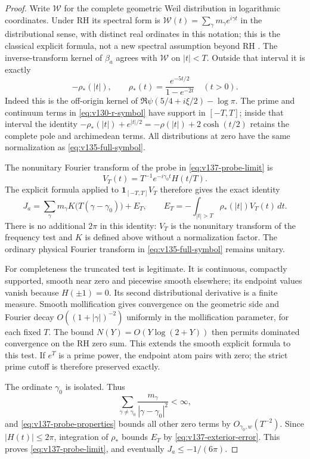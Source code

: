 \begin{proof}
Write $\mathcal W$ for the complete geometric Weil distribution in
logarithmic coordinates. Under RH its spectral form is
$\mathcal W(t)=\sum_\gamma m_\gamma e^{i\gamma t}$ in the distributional
sense, with distinct real ordinates in this notation; this is the
classical explicit formula, not a new spectral assumption beyond RH
\cite[Theorem 2.1]{BurnolExplicit2000}.
The inverse-transform kernel of $\beta_a$ agrees with $\mathcal W$
on $|t|<T$. Outside that interval it is exactly
\[
 -\rho_*(|t|),\qquad
 \rho_*(t)=\frac{e^{-5t/2}}{1-e^{-2t}}\quad(t>0).
\]
Indeed this is the off-origin kernel of
$\Re\psi(5/4+i\xi/2)-\log\pi$. The prime and continuum terms in
\eqref{eq:v130-r-symbol} have support in $[-T,T]$; inside that interval
the identity
$-\rho_*(|t|)+e^{|t|/2}=-\rho(|t|)+2\cosh(t/2)$
retains the complete pole and archimedean terms. All distributions at
zero have the same normalization as \eqref{eq:v135-full-symbol}.

The nonunitary Fourier transform of the probe in \eqref{eq:v137-probe-limit}
is
\[
 V_T(t)=T^{-1}e^{-i\gamma_0t}H(t/T).
\]
The explicit formula applied to $\mathbf1_{[-T,T]}V_T$ therefore gives
the exact identity
\begin{equation}\label{eq:v137-zero-sum}
 J_a=\sum_\gamma m_\gamma K\bigl(T(\gamma-\gamma_0)\bigr)+E_T,
 \qquad
 E_T=-\int_{|t|>T}\rho_*(|t|)V_T(t)\,dt.
\end{equation}
There is no additional $2\pi$ in this identity: $V_T$ is the
nonunitary transform of the frequency test and $K$ is defined above
without a normalization factor. The ordinary physical Fourier transform
in \eqref{eq:v135-full-symbol} remains unitary.

For completeness the truncated test is legitimate. It is continuous,
compactly supported, smooth near zero and piecewise smooth elsewhere;
its endpoint values vanish because $H(\pm1)=0$. Its second distributional
derivative is a finite measure. Smooth mollification gives convergence
on the geometric side and Fourier decay $O((1+|\gamma|)^{-2})$
uniformly in the mollification parameter, for each fixed $T$.
The bound $N(Y)=O(Y\log(2+Y))$ then permits dominated convergence on
the RH zero sum. This extends the smooth explicit formula to this test.
If $e^T$ is a prime power, the endpoint atom pairs with zero; the strict
prime cutoff is therefore preserved exactly.

The ordinate $\gamma_0$ is isolated. Thus
\[
 \sum_{\gamma\ne\gamma_0}
       \frac{m_\gamma}{|\gamma-\gamma_0|^2}<\infty,
\]
and \eqref{eq:v137-probe-properties} bounds all other zero terms by
$O_{\gamma_0,w}(T^{-2})$. Since $|H(t)|\le2\pi$, integration of
$\rho_*$ bounds $E_T$ by \eqref{eq:v137-exterior-error}.
This proves \eqref{eq:v137-probe-limit}, and eventually
$J_a\le-1/(6\pi)$.


\end{proof}
